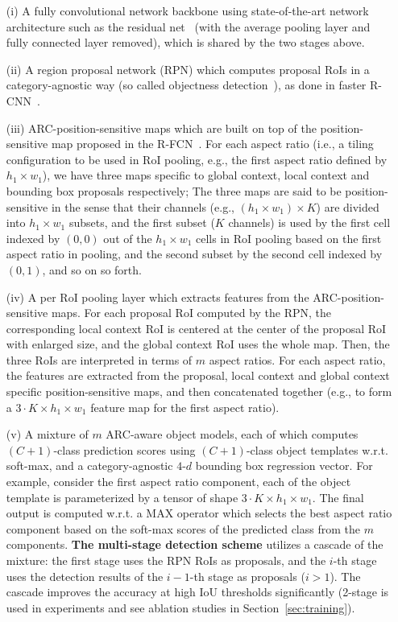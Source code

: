 \documentclass[10pt,twocolumn,letterpaper]{article}
\begin{document}
\begin{itemize}[leftmargin=*]
\itemsep0em 
\item [(i)] A fully convolutional network backbone using state-of-the-art network architecture such as the residual net~\cite{resNet} (with the average pooling layer and fully connected layer removed), which is shared by the two stages above.
\item [(ii)] A region proposal network (RPN) which computes proposal RoIs in a category-agnostic way (so called objectness detection~\cite{SS}), as done in faster R-CNN~\cite{faster_rcnn}.
\item [(iii)] ARC-position-sensitive maps which are built on top of the position-sensitive map proposed in the R-FCN~\cite{rfcn}. For each aspect ratio (i.e., a tiling configuration to be used in RoI pooling, e.g., the first aspect ratio defined by $h_1\times w_1$), we have three maps specific to global context, local context and bounding box proposals respectively; The three maps are said to be position-sensitive in the sense that their channels (e.g., $(h_1\times w_1)\times K$) are divided into $h_1\times w_1$ subsets, and the first subset ($K$ channels) is used by the first cell indexed by $(0,0)$ out of the $h_1\times w_1$ cells in RoI pooling based on the first aspect ratio in pooling, and the second subset by the second cell indexed by $(0,1)$, and so on so forth.   
\item [(iv)] A per RoI pooling layer which extracts features from the ARC-position-sensitive maps.  For each proposal RoI computed by the RPN, the corresponding local context RoI is centered at the center of the proposal RoI with enlarged size, and the global context RoI uses the whole map. Then, the three RoIs are interpreted in terms of $m$ aspect ratios. For each aspect ratio, the features are extracted from the proposal, local context and global context specific position-sensitive maps, and then concatenated together (e.g., to form a $3\cdot K\times h_1 \times w_1$ feature map for the first aspect ratio).  
\item [(v)] A mixture of $m$ ARC-aware object models, each of which computes $(C+1)$-class prediction scores using $(C+1)$-class object templates w.r.t. soft-max, and a category-agnostic $4$-$d$ bounding box regression vector. For example, consider the first aspect ratio component, each of the object template is parameterized by a tensor of shape $3\cdot K\times h_1 \times w_1$. The final output is computed w.r.t. a MAX operator which selects the best aspect ratio component based on the soft-max scores of the predicted class from the $m$ components. \textbf{The multi-stage detection scheme} utilizes a cascade of the mixture: the first stage uses the RPN RoIs as proposals, and the $i$-th stage uses the detection results of the $i-1$-th stage as proposals ($i>1$). The cascade improves the accuracy at high IoU thresholds significantly (2-stage is used in experiments and see ablation studies in Section~\ref{sec:training}).    
\end{itemize}
\end{document}
